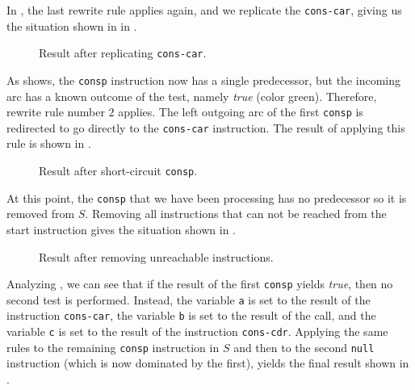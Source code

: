 In , the last rewrite rule applies again, and we
replicate the \texttt{cons-car}, giving us the situation shown in in
.

\begin{figure}
\begin{center}
\end{center}
\caption{\label{fig-rewrite-5}
Result after replicating \texttt{cons-car}.}
\end{figure}

As  shows, the \texttt{consp} instruction now
has a single predecessor, but the incoming arc has a known outcome of
the test, namely \textit{true} (color green).  Therefore, rewrite rule
number $2$ applies.  The left outgoing arc of the first \texttt{consp}
is redirected to go directly to the \texttt{cons-car} instruction.
The result of applying this rule is shown in .

\begin{figure}
\begin{center}
\end{center}
\caption{\label{fig-rewrite-6}
Result after short-circuit \texttt{consp}.}
\end{figure}

At this point, the \texttt{consp} that we have been processing has no
predecessor so it is removed from $S$.  Removing all instructions that
can not be reached from the start instruction gives the situation
shown in .

\begin{figure}
\begin{center}
\end{center}
\caption{\label{fig-rewrite-7}
Result after removing unreachable instructions.}
\end{figure}

Analyzing , we can see that if the result of the
first \texttt{consp} yields \emph{true}, then no second test is
performed.  Instead, the variable \texttt{a} is set to the result of
the instruction \texttt{cons-car}, the variable \texttt{b} is set to
the result of the call, and the variable \texttt{c} is set to the
result of the instruction \texttt{cons-cdr}.  Applying the same rules
to the remaining \texttt{consp} instruction in $S$ and then to the
second \texttt{null} instruction (which is now dominated by the
first), yields the final result shown in  .

